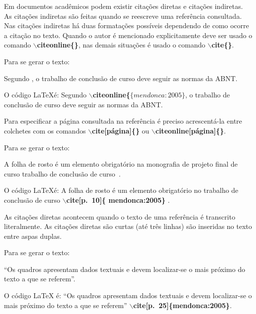 \documentclass[
	article,			%
	11pt,				%
	oneside,			%
	a4paper,			%
	chapter=TITLE,
	english,			%
	brazil,				%
	sumario=tradicional
	]{templateimtec}
\newcommand{\comando}[1]{\textbf{$\backslash$#1}}
\begin{document}
  	Em documentos acadêmicos podem existir citações diretas e citações indiretas. As citações indiretas são feitas quando se reescreve uma referência consultada. Nas citações indiretas há duas formatações possíveis dependendo de como ocorre a citação no texto. Quando o autor é mencionado explicitamente  deve ser usado o comando \comando{citeonline\{\}}, nas demais situações é usado o comando \comando{cite\{\}}.

  	\begin{exemplo}
  	Para se gerar o texto:

  	Segundo , o trabalho de conclusão de curso deve seguir as normas da ABNT.

  	O código \LaTeX \;é:
  	Segundo \comando{citeonline{\{$\{mendonca:2005\}$}}, o trabalho de conclusão de curso deve seguir as normas da ABNT.

  	\end{exemplo}


  	Para especificar a página consultada na referência é preciso acrescentá-la entre colchetes com os comandos \comando{cite[página]\{\}} ou \comando{citeonline[página]\{\}}. 


  	\begin{exemplo}

  	Para se gerar o texto: 

  	A folha de rosto é um elemento obrigatório na monografia de projeto final de curso trabalho de conclusão de curso~\cite[p.~10]{mendonca:2005}.

  	O código \LaTeX \;é:
  	A folha de rosto é um elemento obrigatório no trabalho de conclusão de curso \comando{cite[p.~10]\{ mendonca:2005\} }.

  	\end{exemplo}

  	As citações diretas acontecem quando o texto de uma referência é transcrito literalmente. As citações diretas são curtas (até três linhas) são inseridas no texto entre aspas duplas. 

  	\begin{exemplo}
  	Para se gerar o texto:

  	``Os quadros apresentam dados textuais e devem localizar-se o mais próximo do texto a que se referem''\cite[p.~25]{mendonca:2005}.

  	O código \LaTeX \; é:
  	``Os quadros apresentam dados textuais e devem localizar-se o mais próximo do texto a que se referem'' \comando{cite[p.~25]\{mendonca:2005\}}.

  	\end{exemplo}
\end{document}
